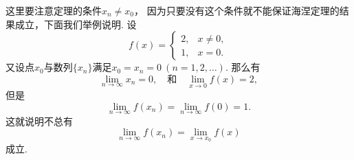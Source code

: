 这里要注意定理的条件\(x_n \neq x_0\)，
因为只要没有这个条件就不能保证海涅定理的结果成立，下面我们举例说明.
设\begin{equation*}
	f(x) = \left\{ \begin{array}{cl}
		2, & x\neq0, \\
		1, & x=0.
	\end{array} \right.
\end{equation*}
又设点\(x_0\)与数列\(\{x_n\}\)满足\(x_0=x_n=0\ (n=1,2,\dotsc)\).
那么有\begin{equation*}
	\lim_{n\to\infty} x_n = 0,
	\quad\text{和}\quad
	\lim_{x\to0} f(x) = 2,
\end{equation*}
但是\begin{equation*}
	\lim_{n\to\infty} f(x_n) = \lim_{n\to\infty} f(0) = 1.
\end{equation*}这就说明不总有\begin{equation*}
	\lim_{n\to\infty} f(x_n)
	= \lim_{x \to x_0} f(x)
\end{equation*}成立.

